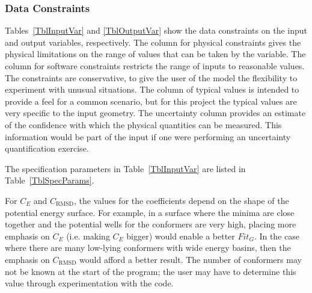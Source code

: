 \documentclass[12pt]{article}
\begin{document}
\subsubsection{Data Constraints} \label{sec_DataConstraints}    

Tables~\ref{TblInputVar} and \ref{TblOutputVar} show the data constraints on the
input and output variables, respectively.  The column for physical constraints gives
the physical limitations on the range of values that can be taken by the
variable.  The column for software constraints restricts the range of inputs to
reasonable values.  The constraints are conservative, to give the user of the
model the flexibility to experiment with unusual situations.  The column of
typical values is intended to provide a feel for a common scenario, but for 
this project the typical values are very specific to the input geometry.  The
uncertainty column provides an estimate of the confidence with which the
physical quantities can be measured.  This information would be part of the
input if one were performing an uncertainty quantification exercise.

The specification parameters in Table~\ref{TblInputVar} are listed in
Table~\ref{TblSpecParams}.


For $C_E$ and $C_\text{RMSD}$, the values for the coefficients depend on the shape 
of the potential energy surface. For example, in a surface where the minima are 
close together and the potential wells for the conformers are very high, 
placing more emphasis on $C_E$ (i.e. making $C_E$ bigger) would enable a better 
$Fit_G$. In the case where there are many low-lying conformers with wide energy 
basins, then the emphasis on $C_\text{RMSD}$ would afford a better result. The 
number of conformers may not be known at the start of the program; the user may 
have to determine this value through experimentation with the code.
\end{document}
